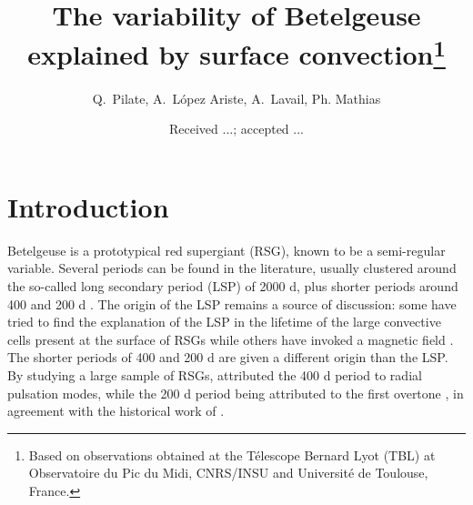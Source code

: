 \documentclass{aa}
\begin{document}
 


   \title{The variability  of Betelgeuse explained by surface convection\thanks{Based on observations obtained at the T\'elescope Bernard Lyot
   (TBL) at Observatoire du Pic du Midi, CNRS/INSU and Universit\'e de
   Toulouse, France.}}
 

    \author{{ Q.~Pilate},{ A.~L{\'o}pez Ariste},{ A.~Lavail},{ Ph. Mathias} }


   \date{Received ...; accepted ...}

 
  \abstract
 

   \keywords{
               }

   \maketitle
%

\section{Introduction}
\label{sec:introduction}
Betelgeuse is a prototypical red supergiant (RSG), known to be a semi-regular variable. Several periods can be found in the 
literature, usually clustered around the so-called long secondary period (LSP) of 2000 d, plus shorter periods around 400 and 200 d \citep{kiss_variability_2006}. The origin of the LSP remains a source of discussion: some have tried to find the explanation of the LSP in the lifetime of the large convective cells present at the surface of RSGs \citep[e.g][]{stothers_giant_2010} while others have invoked a magnetic field \citep{wood_long_2004}. The shorter periods of 400 and 200 d are given a different origin than the LSP. By studying a large sample of RSGs, \cite{kiss_variability_2006} attributed the 400 d period to radial pulsation modes, while the 200 d period being attributed to the first overtone \citep{joyce_standing_2020}, in agreement with the historical work of \cite{stothers_pulsation_1969}.\\
\end{document}
